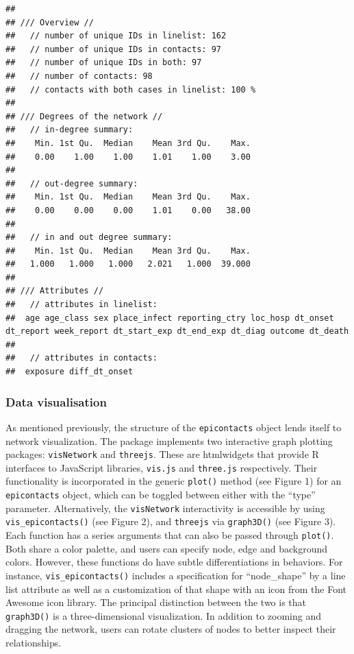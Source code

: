 \documentclass[9pt,a4paper,]{extarticle}
\theoremstyle{definition}
\theoremstyle{definition}
\theoremstyle{definition}
\theoremstyle{remark}
\begin{document}
\begin{verbatim}
## 
## /// Overview //
##   // number of unique IDs in linelist: 162
##   // number of unique IDs in contacts: 97
##   // number of unique IDs in both: 97
##   // number of contacts: 98
##   // contacts with both cases in linelist: 100 %
## 
## /// Degrees of the network //
##   // in-degree summary:
##    Min. 1st Qu.  Median    Mean 3rd Qu.    Max. 
##    0.00    1.00    1.00    1.01    1.00    3.00 
## 
##   // out-degree summary:
##    Min. 1st Qu.  Median    Mean 3rd Qu.    Max. 
##    0.00    0.00    0.00    1.01    0.00   38.00 
## 
##   // in and out degree summary:
##    Min. 1st Qu.  Median    Mean 3rd Qu.    Max. 
##   1.000   1.000   1.000   2.021   1.000  39.000 
## 
## /// Attributes //
##   // attributes in linelist:
##  age age_class sex place_infect reporting_ctry loc_hosp dt_onset dt_report week_report dt_start_exp dt_end_exp dt_diag outcome dt_death
## 
##   // attributes in contacts:
##  exposure diff_dt_onset
\end{verbatim}

\subsubsection{Data visualisation}\label{data-visualisation}

As mentioned previously, the structure of the \texttt{epicontacts} object lends itself to network visualization. The package implements two interactive graph plotting packages: \texttt{visNetwork} and \texttt{threejs}\citep{visNetwork}\citep{threejs}. These are htmlwidgets that provide R interfaces to JavaScript libraries, \texttt{vis.js} and \texttt{three.js} respectively. Their functionality is incorporated in the generic \texttt{plot()} method (see Figure 1) for an \texttt{epicontacts} object, which can be toggled between either with the ``type'' parameter. Alternatively, the \texttt{visNetwork} interactivity is accessible by using \texttt{vis\_epicontacts()} (see Figure 2), and \texttt{threejs} via \texttt{graph3D()} (see Figure 3). Each function has a series arguments that can also be passed through \texttt{plot()}. Both share a color palette, and users can specify node, edge and background colors. However, these functions do have subtle differentiations in behaviors. For instance, \texttt{vis\_epicontacts()} includes a specification for ``node\_shape'' by a line list attribute as well as a customization of that shape with an icon from the Font Awesome icon library. The principal distinction between the two is that \texttt{graph3D()} is a three-dimensional visualization. In addition to zooming and dragging the network, users can rotate clusters of nodes to better inspect their relationships.
\end{document}
